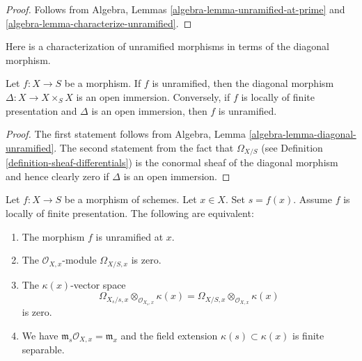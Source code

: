 \begin{proof}
Follows from Algebra, Lemmas
\ref{algebra-lemma-unramified-at-prime} and
\ref{algebra-lemma-characterize-unramified}.
\end{proof}

\noindent
Here is a characterization of unramified morphisms in terms of the
diagonal morphism.

\begin{lemma}
\label{lemma-diagonal-unramfied-morphism}
Let $f : X \to S$ be a morphism. If $f$ is unramified, then
the diagonal morphism $\Delta : X \to X \times_S X$
is an open immersion. Conversely, if $f$ is locally of finite presentation
and $\Delta$ is an open immersion, then $f$ is unramified.
\end{lemma}

\begin{proof}
The first statement follows from
Algebra, Lemma \ref{algebra-lemma-diagonal-unramified}.
The second statement from the fact that $\Omega_{X/S}$
(see Definition \ref{definition-sheaf-differentials})
is the conormal sheaf of the diagonal morphism and hence
clearly zero if $\Delta$ is an open immersion.
\end{proof}

\begin{lemma}
\label{lemma-unramified-at-point}
Let $f : X \to S$ be a morphism of schemes.
Let $x \in X$.
Set $s = f(x)$.
Assume $f$ is locally of finite presentation.
The following are equivalent:
\begin{enumerate}
\item The morphism $f$ is unramified at $x$.
\item The $\mathcal{O}_{X, x}$-module $\Omega_{X/S, x}$ is zero.
\item The $\kappa(x)$-vector space
$$
\Omega_{X_s/s, x} \otimes_{\mathcal{O}_{X_s, x}} \kappa(x) =
\Omega_{X/S, x} \otimes_{\mathcal{O}_{X, x}} \kappa(x)
$$
is zero.
\item We have $\mathfrak m_s\mathcal{O}_{X, x} = \mathfrak m_x$
and the field extension $\kappa(s) \subset \kappa(x)$ is finite
separable.
\end{enumerate}
\end{lemma}

